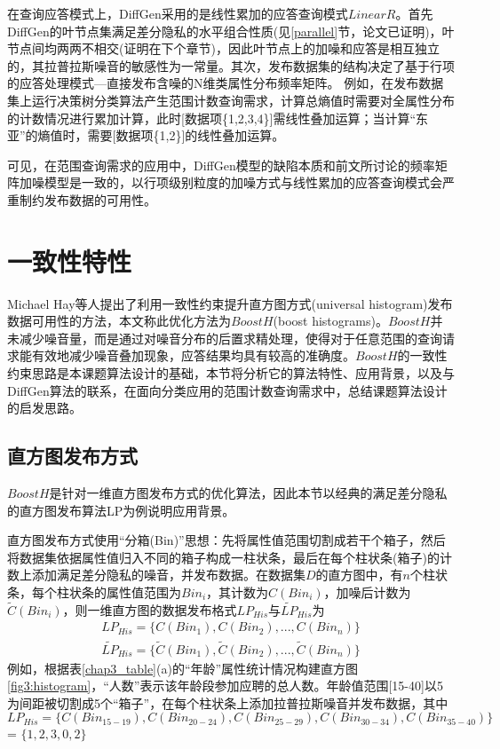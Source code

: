 在查询应答模式上，DiffGen采用的是线性累加的应答查询模式$LinearR$。首先DiffGen的叶节点集满足差分隐私的水平组合性质(见\ref{parallel}节，论文\parencite{DiffGen}已证明)，叶节点间均两两不相交(证明在下个章节)，因此叶节点上的加噪和应答是相互独立的，其拉普拉斯噪音的敏感性为一常量。其次，发布数据集的结构决定了基于行项的应答处理模式---直接发布含噪的N维类属性分布频率矩阵。
例如，在发布数据集上运行决策树分类算法产生范围计数查询需求，计算总熵值时需要对全属性分布的计数情况进行累加计算，此时[数据项\{1,2,3,4\}]需线性叠加运算；当计算“东亚”的熵值时，需要[数据项\{1,2\}]的线性叠加运算。

可见，在范围查询需求的应用中，DiffGen模型的缺陷本质和前文所讨论的频率矩阵加噪模型是一致的，以行项级别粒度的加噪方式与线性累加的应答查询模式会严重制约发布数据的可用性。


\section{一致性特性}

Michael Hay等人提出了利用一致性约束提升直方图方式(universal histogram)发布数据可用性的方法\supercite{boosting}，本文称此优化方法为$BoostH$(boost histograms)。$BoostH$并未减少噪音量，而是通过对噪音分布的后置求精处理，使得对于任意范围的查询请求能有效地减少噪音叠加现象，应答结果均具有较高的准确度。$BoostH$的一致性约束思路是本课题算法设计的基础，本节将分析它的算法特性、应用背景，以及与DiffGen算法的联系，在面向分类应用的范围计数查询需求中，总结课题算法设计的启发思路。

\subsection{直方图发布方式}  %

$BoostH$是针对一维直方图发布方式的优化算法，因此本节以经典的满足差分隐私的直方图发布算法LP\supercite{Dwork Calibrating}为例说明应用背景。

直方图发布方式使用“分箱(Bin)”思想：先将属性值范围切割成若干个箱子，然后将数据集依据属性值归入不同的箱子构成一柱状条，最后在每个柱状条(箱子)的计数上添加满足差分隐私的噪音，并发布数据。在数据集$D$的直方图中，有$n$个柱状条，每个柱状条的属性值范围为$Bin_{i}$，其计数为$C(Bin_{i})$，加噪后计数为$\tilde{C}(Bin_{i})$，则一维直方图的数据发布格式$LP_{His}$与$\widetilde{LP}_{His}$为
\[
\begin{split}
	LP_{His} = \{C(Bin_{1}),C(Bin_{2}),...,C(Bin_{n})\}\\
	\widetilde{LP}_{His} = \{\tilde{C}(Bin_{1}),\tilde{C}(Bin_{2}),...,\tilde{C}(Bin_{n})\}	
\end{split}
\]
例如，根据表\ref{chap3_table}(a)的“年龄”属性统计情况构建直方图\ref{fig3:histogram}，“人数”表示该年龄段参加应聘的总人数。年龄值范围[15-40]以5为间距被切割成5个“箱子”，在每个柱状条上添加拉普拉斯噪音并发布数据，其中$LP_{His} = \{C(Bin_{15-19}),C(Bin_{20-24}),C(Bin_{25-29}),C(Bin_{30-34}),C(Bin_{35-40})\}$ = $\{1,2,3,0,2\}$%

